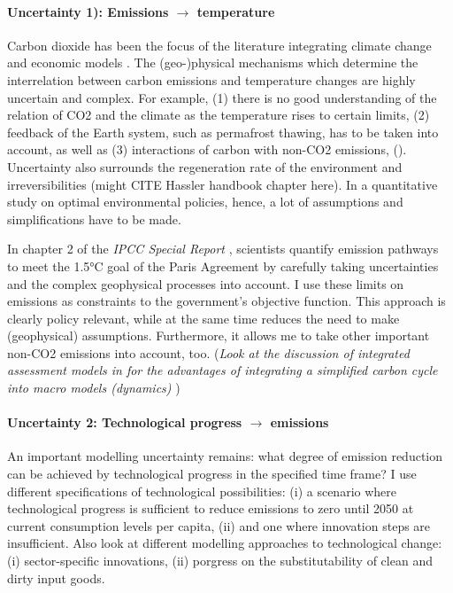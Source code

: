 \paragraph{Uncertainty 1): Emissions $\rightarrow$ temperature}
Carbon dioxide has been the focus of the literature integrating climate change and economic models \citep[such as,][]{Golosov2014OptimalEquilibrium,Barrage2019OptimalPolicy}. 
The (geo-)physical mechanisms which determine the interrelation between carbon emissions and temperature changes are highly uncertain and complex. For example, (1) there is no good understanding of the relation of CO2 and the climate as the temperature rises to certain limits, (2)  feedback of the Earth system, such as permafrost thawing, has to be taken into account, as well as (3) interactions of carbon with non-CO2 emissions, (\citep[][p.96, 2nd paragraph]{Rogelj2018MitigationDevelopment.}).  Uncertainty also surrounds the regeneration rate of the environment \citep{Acemoglu2012TheChange} and irreversibilities (might CITE Hassler handbook chapter here). In a quantitative study on optimal environmental policies, hence, a lot of assumptions and simplifications have to be made. 

In chapter 2 of the
\textit{IPCC Special Report} \citep{Rogelj2018MitigationDevelopment.}, scientists quantify emission pathways to meet the 1.5°C goal of the Paris Agreement by carefully taking uncertainties and the complex geophysical processes into account. I use these limits on emissions as constraints to the government's objective function. This approach is clearly policy relevant, while at the same time reduces the need to make (geophysical) assumptions. Furthermore, it allows me to take other important non-CO2 emissions into account, too. (\textit{Look at the discussion of integrated assessment models in \cite{Hassler2016EnvironmentalMacroeconomics} for the advantages of integrating a simplified carbon cycle into macro models (\ar dynamics) })

\paragraph{Uncertainty 2: Technological progress $\rightarrow$ emissions}
An important modelling uncertainty remains: what degree of emission reduction can be achieved by technological progress in the specified time frame? I use different specifications of technological possibilities: (i) a scenario where technological progress is sufficient to reduce emissions to zero until 2050 at current consumption levels per capita, (ii) and one where innovation steps are insufficient.
Also look at different modelling approaches to technological change: (i) sector-specific innovations, (ii) porgress on the substitutability of clean and dirty input goods.

